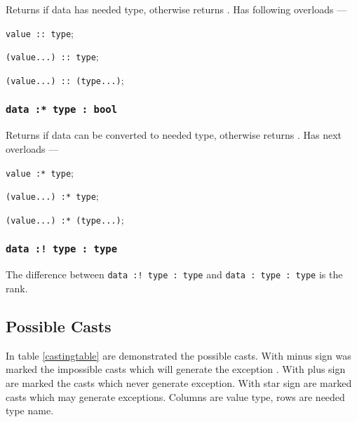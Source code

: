 Returns \true{} if data has needed type, otherwise returns \false. Has following overloads —
\begin{icItems}
	\item \texttt{value :: type};
	\item \texttt{(value...) :: type};
	\item \texttt{(value...) :: (type...)};
\end{icItems}

\subsubsection{\texttt{data :* type : bool}}

Returns \true{} if data can be converted to needed type, otherwise returns \false. Has next overloads —
\begin{icItems}
	\item \texttt{value :* type};
	\item \texttt{(value...) :* type};
	\item \texttt{(value...) :* (type...)};
\end{icItems}

\subsubsection{\texttt{data :! type : type}}

The difference between \texttt{data :! type : type} and \texttt{data : type : type} is the rank.

\subsection{Possible Casts}

In table \ref{castingtable} are demonstrated the possible casts.
With minus sign was marked the impossible casts which will generate the exception . With plus sign are marked the casts which never generate exception. With star sign are marked casts which may generate exceptions. Columns are value type, rows are needed type name.

